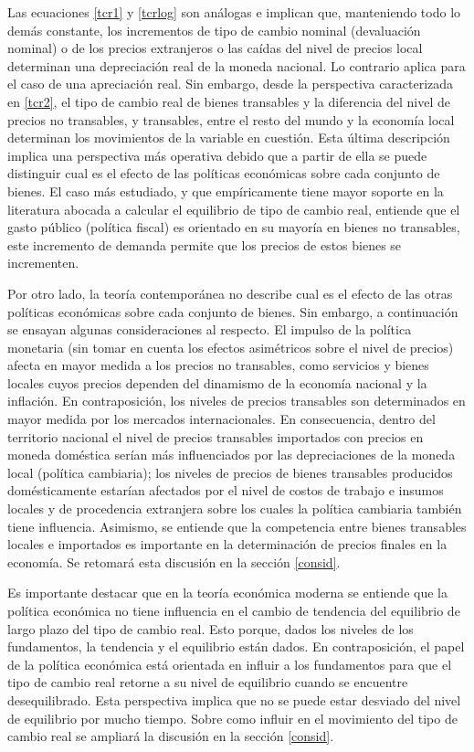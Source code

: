 \documentclass[12pt,letterpaper]{article}
\begin{document}
Las ecuaciones \ref{tcr1} y \ref{tcrlog} son análogas e implican que, manteniendo todo lo demás constante, los incrementos de tipo de cambio nominal (devaluación nominal) o de los precios extranjeros o las caídas del nivel de precios local determinan una depreciación real de la moneda nacional. Lo contrario aplica para el caso de una apreciación real. Sin embargo, desde la perspectiva caracterizada en \ref{tcr2}, el tipo de cambio real de bienes transables y la diferencia del nivel de precios no transables, y transables, entre el resto del mundo y la economía local determinan los movimientos de la variable en cuestión. Esta última descripción implica una perspectiva más operativa debido que a partir de ella se puede distinguir cual es el efecto de las políticas económicas sobre cada conjunto de bienes. El caso más estudiado, y que empíricamente tiene mayor soporte en la literatura abocada a calcular el equilibrio de tipo de cambio real, entiende que el gasto público (política fiscal) es orientado en su mayoría en bienes no transables, este incremento de demanda permite que los precios de estos bienes se incrementen. 

Por otro lado, la teoría contemporánea no describe cual es el efecto de las otras políticas económicas sobre cada conjunto de bienes. Sin embargo, a continuación se ensayan algunas consideraciones al respecto. El impulso de la política monetaria (sin tomar en cuenta los efectos asimétricos sobre el nivel de precios) afecta en mayor medida a los precios no transables, como servicios y bienes locales cuyos precios dependen del dinamismo de la economía nacional y la inflación. En contraposición, los niveles de precios transables son determinados en mayor medida por los mercados internacionales. En consecuencia, dentro del territorio nacional el nivel de precios transables importados con precios en moneda doméstica serían más influenciados por las depreciaciones de la moneda local (política cambiaria); los niveles de precios de bienes transables producidos domésticamente estarían afectados por el nivel de costos de trabajo e insumos locales y de procedencia extranjera sobre los cuales la política cambiaria también tiene influencia. Asimismo, se entiende que la competencia entre bienes transables locales e importados es importante en la determinación de precios finales en la economía. Se retomará esta discusión en la sección \ref{consid}.

Es importante destacar que en la teoría económica moderna se entiende que la política económica no tiene influencia en el cambio de tendencia del equilibrio de largo plazo del tipo de cambio real. Esto porque, dados los niveles de los fundamentos, la tendencia y el equilibrio están dados. En contraposición, el papel de la política económica está orientada en influir a los fundamentos para que el tipo de cambio real retorne a su nivel de equilibrio cuando se encuentre desequilibrado. Esta perspectiva implica que no se puede estar desviado del nivel de equilibrio por mucho tiempo. Sobre como influir en el movimiento del tipo de cambio real se ampliará la discusión en la sección \ref{consid}.
\end{document}
